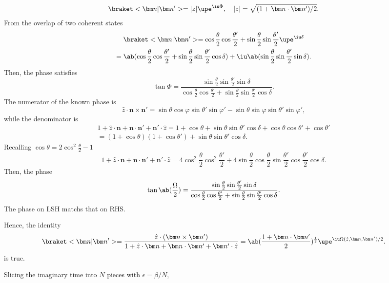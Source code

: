 \begin{solution}
\begin{enumext}
\begin{enumext}
\[        \braket<\bm n|\bm n'> = |z|\upe^{\iu\Phi}, \quad
        |z| = \sqrt{(1 + \bm n \cdot \bm n')/2}.
      \]
      From the overlap of two coherent states
      \begin{multline*}
        \braket<\bm n|\bm n'> = \cos\frac\theta2 \cos\frac{\theta'}{2}
          + \sin\frac\theta2 \sin\frac{\theta'}{2} \upe^{\iu\delta}\\
      = \ab(\cos\frac\theta2 \cos\frac{\theta'}{2}
      + \sin\frac\theta2 \sin\frac{\theta'}{2} \cos \delta)
      + \iu \ab(\sin\frac\theta2 \sin\frac{\theta'}{2} \sin \delta).
      \end{multline*}
      Then, the phase satisfies
      \[
        \tan \Phi = \frac{\sin\frac\theta2 \sin\frac{\theta'}{2} \sin \delta}
          {\cos\frac\theta2 \cos\frac{\theta'}{2}
          + \sin\frac\theta2 \sin\frac{\theta'}{2} \cos \delta}.
      \]
      The numerator of the known phase is
      \[
        \hat z \cdot \bm n \times \bm n'
      = \sin\theta \cos\varphi \sin\theta' \sin\varphi'
      - \sin\theta \sin\varphi \sin\theta' \sin\varphi',
      \]
      while the denominator is
      \begin{multline*}
        1 + \hat z \cdot \bm n + \bm n \cdot \bm n' + \bm n' \cdot \hat z
      = 1 + \cos\theta
        + \sin\theta \sin\theta' \cos \delta + \cos\theta \cos\theta'
        + \cos\theta'\\
      = (1 + \cos\theta)(1 + \cos\theta') + \sin\theta \sin\theta' \cos \delta.
      \end{multline*}
      Recalling $\cos\theta = 2\cos^2\frac\theta2 - 1$
      \[
        1 + \hat z \cdot \bm n + \bm n \cdot \bm n' + \bm n' \cdot \hat z
      = 4\cos^2\frac\theta2 \cos^2\frac{\theta'}{2}
      + 4 \sin\frac\theta2 \cos\frac\theta2
          \sin\frac{\theta'}{2} \cos\frac{\theta'}{2} \cos \delta.
      \]
      Then, the phase
      \[
        \tan\ab(\frac\Omega2)
      = \frac{\sin\frac\theta2 \sin\frac{\theta'}{2} \sin \delta}
          {\cos\frac\theta2 \cos\frac{\theta'}{2}
          + \sin\frac\theta2 \sin\frac{\theta'}{2} \cos \delta}.
      \]
      The phase on LSH matchs that on RHS.
    \end{enumext}
    Hence, the identity
    \[
      \braket<\bm n|\bm n'>
    = \frac{\hat z \cdot (\bm n \times \bm n')}
        {1 + \hat z \cdot \bm n + \bm n \cdot \bm n' + \bm n' \cdot \hat z}
    = \ab(\frac{1 + \bm n \cdot \bm n'}{2})^{\frac12}
      \upe^{\iu\Omega(\hat z, \bm n, \bm n')/2}.
    \]
    is true.
    \item Slicing the imaginary time into $N$ pieces with $\epsilon = \beta/N$,

\end{enumext}
\end{solution}
